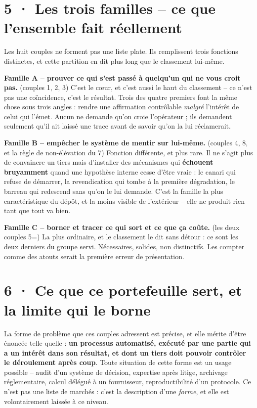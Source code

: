 \documentclass[10pt]{article}
\newcommand{\sz}[1]{{\small\color{grey}\textsf{#1}}}
\begin{document}
\section{5 · Les trois familles -- ce que l'ensemble fait réellement}

Les huit couples ne forment pas une liste plate. Ils remplissent trois fonctions distinctes, et cette
partition en dit plus long que le classement lui-même.

\textbf{Famille A -- prouver ce qui s'est passé à quelqu'un qui ne vous croit pas.} \sz{(couples 1, 2, 3)}
C'est le c\oe ur, et c'est aussi le haut du classement -- ce n'est pas une coïncidence, c'est le
résultat. Trois des quatre premiers font la même chose sous trois angles : rendre une affirmation
contrôlable \emph{malgré} l'intérêt de celui qui l'émet. Aucun ne demande qu'on croie l'opérateur ; ils
demandent seulement qu'il ait laissé une trace avant de savoir qu'on la lui réclamerait.

\textbf{Famille B -- empêcher le système de mentir sur lui-même.} \sz{(couples 4, 8, et la règle de non-élévation du 7)}
Fonction différente, et plus rare. Il ne s'agit plus de convaincre un tiers mais d'installer des
mécanismes qui \textbf{échouent bruyamment} quand une hypothèse interne cesse d'être vraie : le canari
qui refuse de démarrer, la revendication qui tombe à la première dégradation, le barreau qui redescend
sans qu'on le lui demande. C'est la famille la plus caractéristique du dépôt, et la moins visible de
l'extérieur -- elle ne produit rien tant que tout va bien.

\textbf{Famille C -- borner et tracer ce qui sort et ce que ça coûte.} \sz{(les deux couples 5=)}
La plus ordinaire, et le classement le dit sans détour : ce sont les deux derniers du groupe servi.
Nécessaires, solides, non distinctifs. Les compter comme des atouts serait la première erreur de
présentation.

\section{6 · Ce que ce portefeuille sert, et la limite qui le borne}

La forme de problème que ces couples adressent est précise, et elle mérite d'être énoncée telle
quelle : \textbf{un processus automatisé, exécuté par une partie qui a un intérêt dans son résultat, et
dont un tiers doit pouvoir contrôler le déroulement après coup}. Toute situation de cette forme est un
usage possible -- audit d'un système de décision, expertise après litige, archivage réglementaire,
calcul délégué à un fournisseur, reproductibilité d'un protocole. Ce n'est pas une liste de marchés :
c'est la description d'une \emph{forme}, et elle est volontairement laissée à ce niveau.
\end{document}
